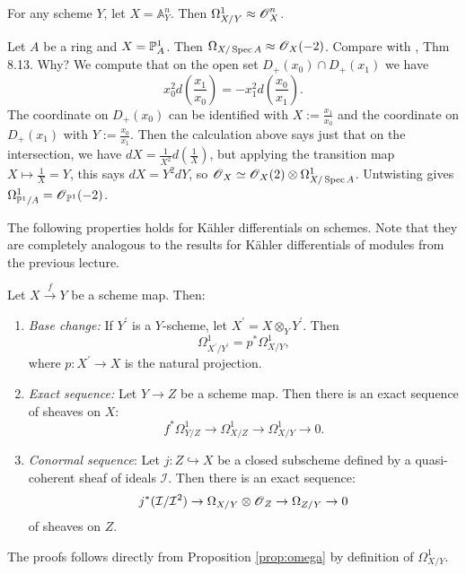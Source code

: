 \documentclass[11pt, english]{article}
\begin{document}
\begin{example}
For any scheme $Y$, let $X=\mathbb A_Y^n$. Then $\Omega_{X/Y}^1 \approx \operatorname{\mathscr{O}}_X^n$.
\end{example}

\begin{example}
Let $A$ be a ring and $X=\mathbb{P}_A^1$. Then $\Omega_{X/\operatorname{Spec} A} \approx \operatorname{\mathscr{O}}_X(-2)$. Compare with \cite[Chapter II, §8]{hartshorne}, Thm 8.13. Why? We compute that on the open set $D_+(x_0) \cap D_+(x_1)$ we have
\[
x_0^2d(\frac{x_1}{x_0}) = -x_1^2 d(\frac{x_0}{x_1}).
\]
The coordinate on $D_+(x_0)$ can be identified with $X:=\frac{x_1}{x_0}$ and the coordinate on $D_+(x_1)$ with $Y:=\frac{x_0}{x_1}$. Then the calculation above says just that on the intersection, we have $dX=\frac{1}{X^2} d(\frac{1}{X})$, but applying the transition map $X \mapsto \frac 1X=Y$, this says $dX = Y^2 dY$, so $\operatorname{\mathscr{O}}_X \simeq \operatorname{\mathscr{O}}_X(2) \otimes \Omega_{X/\operatorname{Spec} A}^1$. Untwisting gives $\Omega_{\mathbb{P}^1/A}^1=\operatorname{\mathscr{O}}_{\mathbb{P}^1}(-2)$.
\end{example}

The following properties holds for Kähler differentials on schemes. Note that they are completely analogous to the results for Kähler differentials of modules from the previous lecture.

\begin{prop}
Let $X \xrightarrow{f} Y$ be a scheme map. Then:
\begin{enumerate}
\item 
\emph{Base change:} If $Y^\prime$ is a $Y$-scheme, let $X^\prime = X \otimes_Y Y^\prime$. Then
\[
\Omega_{X^\prime/Y^\prime}^1 = p^\ast \Omega_{X/Y}^1,
\]
where $p:X^\prime \to X$ is the natural projection.
\item \emph{Exact sequence:} Let $Y \to Z$ be a scheme map. Then there is an exact sequence of sheaves on $X$:
\[
f^\ast \Omega_{Y/Z}^1 \to \Omega_{X/Z}^1 \to \Omega_{X/Y}^1 \to 0.
\]
\item
\emph{Conormal sequence}: Let $j:Z \hookrightarrow X$ be a closed subscheme defined by a quasi-coherent sheaf of ideals $\mathcal I$. Then there is an exact sequence:
\[
j^\ast(\mathcal I/\mathcal I^2) \to \Omega_{X/Y} \otimes \operatorname{\mathscr{O}}_Z \to \Omega_{Z/Y} \to 0
\]
of sheaves on $Z$.
\end{enumerate}
\end{prop}

The proofs follows directly from Proposition \ref{prop:omega} by definition of $\Omega_{X/Y}^1$. 


\pagebreak
\end{document}
